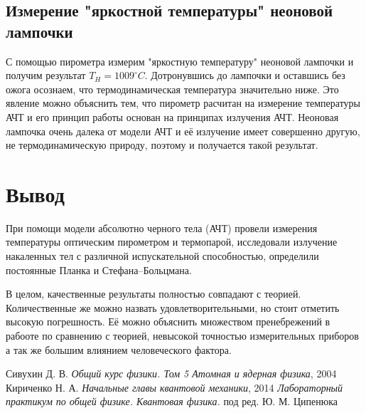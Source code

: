 \documentclass[a4paper,12pt]{article} %
\begin{document}
\newpage

\subsection * {Измерение "яркостной температуры" неоновой лампочки}

С помощью пирометра измерим "яркостную температуру" неоновой лампочки и получим результат $T_H = 1009 ^\circ C$. Дотронувшись до лампочки и оставшись без ожога осознаем, что термодинамическая температура значительно ниже. Это явление можно объяснить тем, что пирометр расчитан на измерение температуры АЧТ и его принцип работы основан на принципах излучения АЧТ. Неоновая лампочка очень далека от модели АЧТ и её излучение имеет совершенно другую, не термодинамическую природу, поэтому и получается такой результат. 

\section * {Вывод}

При помощи модели абсолютно черного тела (АЧТ) провели измерения температуры оптическим пирометром и термопарой, исследовали излучение накаленных тел с различной испускательной способностью, определили постоянные Планка и Стефана–Больцмана. \par

В целом, качественные результаты полностью совпадают с теорией. Количественные же можно назвать удовлетворительными, но стоит отметить высокую погрешность. Её можно объяснить множеством пренебрежений в рабооте по сравнению с теорией, невысокой точностью измерительных приборов а так же большим влиянием человеческого фактора.


\begin{thebibliography}{9}
	 Сивухин Д. В. \emph{Общий курс физики. Том 5 Атомная и ядерная физика}, 2004
	 Кириченко Н. А. \emph{Начальные главы квантовой механики}, 2014
	 \emph{Лабораторный практикум по общей физике. Квантовая физика.} под ред. Ю. М. Ципенюка
\end{thebibliography}
\end{document}
